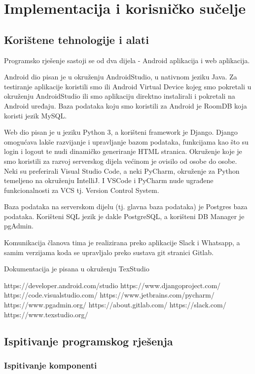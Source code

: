 \chapter{Implementacija i korisničko sučelje}
	\section{Korištene tehnologije i alati}
		Programsko rješenje sastoji se od dva dijela - Android aplikacija i web aplikacija.
		
		Android dio pisan je u okruženju AndroidStudio, u nativnom jeziku Java. Za testiranje aplikacije koristili smo ili Android Virtual Device kojeg smo pokretali u okruženju AndroidStudio ili smo aplikaciju direktno instalirali i pokretali na Android uređaju. Baza podataka koju smo koristili za Android je RoomDB koja koristi jezik MySQL.
		
		Web dio pisan je u jeziku Python 3, a korišteni framework je Django. Django omogućava lakše razvijanje i upravljanje bazom podataka, funkcijama kao što su login i logout te nudi dinamičko generiranje HTML stranica. Okruženje koje je smo koristili za razvoj serverskog dijela većinom je ovisilo od osobe do osobe. Neki su preferirali Visual Studio Code, a neki PyCharm, okruženje za Python temeljeno na okruženju IntelliJ. I VSCode i PyCharm nude ugrađene funkcionalnosti za VCS tj. Version Control System.
		
		Baza podataka na serverskom dijelu (tj. glavna baza podataka) je Postgres baza podataka. Korišteni SQL jezik je dakle PostgreSQL, a korišteni DB Manager je pgAdmin.
		
		Komunikacija članova tima je realizirana preko aplikacije Slack i Whatsapp, a samim verzijama koda se upravljalo preko sustava git stranici Gitlab.
		
		Dokumentacija je pisana u okruženju TexStudio
		
		https://developer.android.com/studio
		https://www.djangoproject.com/
		https://code.visualstudio.com/
		https://www.jetbrains.com/pycharm/
		https://www.pgadmin.org/
		https://about.gitlab.com/
		https://slack.com/
		https://www.texstudio.org/
		
		
		\eject
	\section{Ispitivanje programskog rješenja}
		\subsection{Ispitivanje komponenti}
			
